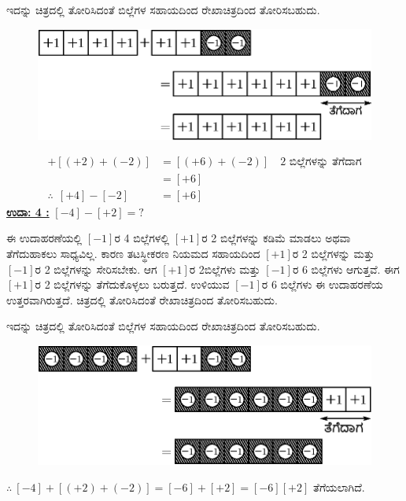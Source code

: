 ಇದನ್ನು ಚಿತ್ರದಲ್ಲಿ ತೋರಿಸಿದಂತೆ ಬಿಲ್ಲೆಗಳ ಸಹಾಯದಿಂದ ರೇಖಾಚಿತ್ರದಿಂದ ತೋರಿಸಬಹುದು. 
\begin{figure}[H]
\centering
\includegraphics[scale=0.8]{src/figure/chap3/fig3-14b.eps}
\end{figure}
\begin{align*}
[+4]+[(+2)+(-2)] &= [(+6)+(-2)]\quad \text{2 ಬಿಲ್ಲೆಗಳನ್ನು ತೆಗೆದಾಗ}\\
                 &= [+6]\\
                 \therefore ~~ [+4] - [-2] & = [+6]
\end{align*}
\noindent
{\textbf{\underline{ಉದಾ: 4 :}}} $[-4] - [+2] = ?$

ಈ ಉದಾಹರಣೆಯಲ್ಲಿ $[-1]$ರ 4 ಬಿಲ್ಲೆಗಳಲ್ಲಿ $[+1]$ರ 2 ಬಿಲ್ಲೆಗಳನ್ನು ಕಡಿಮೆ ಮಾಡಲು ಅಥವಾ ತೆಗೆದುಹಾಕಲು ಸಾಧ್ಯವಿಲ್ಲ. ಕಾರಣ ತಟಸ್ಥೀಕರಣ ನಿಯಮದ ಸಹಾಯದಿಂದ $[+1]$ರ 2 ಬಿಲ್ಲೆಗಳನ್ನು ಮತ್ತು $[-1]$ರ 2 ಬಿಲ್ಲೆಗಳನ್ನು ಸೇರಿಸಬೇಕು. ಆಗ $[+1]$ರ 2\break ಬಿಲ್ಲೆಗಳು ಮತ್ತು $[-1]$ರ 6 ಬಿಲ್ಲೆಗಳು ಆಗುತ್ತವೆ. ಈಗ $[+1]$ರ 2 ಬಿಲ್ಲೆಗಳನ್ನು ತೆಗೆದು\break ಕೊಳ್ಳಲು ಬರುತ್ತದೆ. ಉಳಿಯುವ $[-1]$ರ 6 ಬಿಲ್ಲೆಗಳು ಈ ಉದಾಹರಣೆಯ ಉತ್ತರವಾಗಿರುತ್ತದೆ. ಚಿತ್ರದಲ್ಲಿ ತೋರಿಸಿದಂತೆ ರೇಖಾಚಿತ್ರದಿಂದ ತೋರಿಸಬಹುದು.

ಇದನ್ನು ಚಿತ್ರದಲ್ಲಿ ತೋರಿಸಿದಂತೆ ಬಿಲ್ಲೆಗಳ ಸಹಾಯದಿಂದ ರೇಖಾಚಿತ್ರದಿಂದ ತೋರಿಸಬಹುದು.
\begin{figure}[H]
\centering
\includegraphics[scale=0.8]{src/figure/chap3/fig3-15b.eps}
\end{figure}
$\therefore \ [-4]+[(+2)+(-2)]=[-6]+[+2]=[-6]$\qquad $[+2]$ ತೆಗೆಯಲಾಗಿದೆ.


